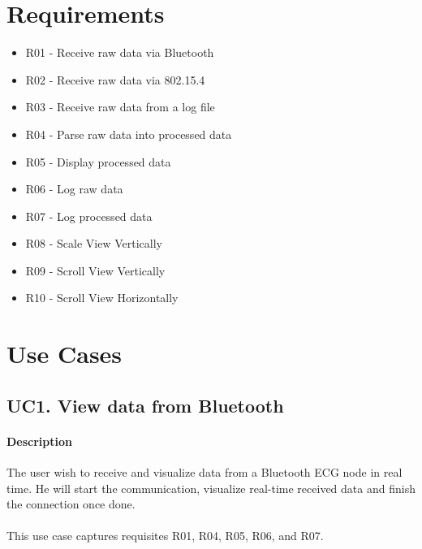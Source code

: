 	\begin{comment}
	Full implementation, architectural and yadda yadda are presented in Annex X
	\end{comment}

	\section{Requirements}

		\begin{itemize}
		\item R01 - Receive raw data via Bluetooth
		\item R02 - Receive raw data via 802.15.4
		\item R03 - Receive raw data from a log file
		\item R04 - Parse raw data into processed data
		\item R05 - Display processed data
		\item R06	- Log raw data
		\item R07 - Log processed data	%
		\item R08 - Scale View Vertically
		\item R09 - Scroll View Vertically
		\item R10 - Scroll View Horizontally
		\end{itemize}


\begin{comment}
\newcounter{uccounter}
\newcommand{\addUC}[1]{
	\stepcounter{uccounter}
	\bf{UC\arabic{uccounter} #1}
	}
\end{comment}
	
	\section{Use Cases}
		\subsection{UC1. View data from Bluetooth}

			\paragraph{Description} The user wish to receive and visualize data from 	a Bluetooth ECG node in real time. He will start the communication, visualize real-time received data and finish the connection once done.\\
			\\This use case captures requisites R01, R04, R05, R06, and R07.

